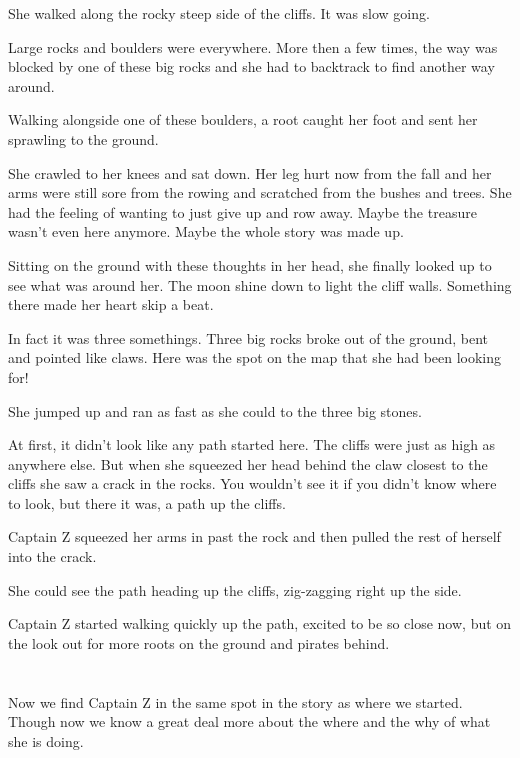 \documentclass[12pt]{extbook}
\begin{document}
  She walked along the rocky steep side of the cliffs. It was slow going.
  
  Large rocks and boulders were everywhere. More then a few times, the way
  was blocked by one of these big rocks and she had to backtrack to find
  another way around.
  
  Walking alongside one of these boulders, a root caught her foot and sent
  her sprawling to the ground.
  
  She crawled to her knees and sat down. Her leg hurt now from the fall
  and her arms were still sore from the rowing and scratched from the
  bushes and trees. She had the feeling of wanting to just give up and row
  away. Maybe the treasure wasn't even here anymore. Maybe the whole story
  was made up.
  
  Sitting on the ground with these thoughts in her head, she finally
  looked up to see what was around her. The moon shine down to light the
  cliff walls. Something there made her heart skip a beat.
  
  In fact it was three somethings. Three big rocks broke out of the
  ground, bent and pointed like claws. Here was the spot on the map that
  she had been looking for!
  
  She jumped up and ran as fast as she could to the three big stones.
  
  At first, it didn't look like any path started here. The cliffs were
  just as high as anywhere else. But when she squeezed her head behind the
  claw closest to the cliffs she saw a crack in the rocks. You wouldn't
  see it if you didn't know where to look, but there it was, a path up the
  cliffs.
  
  Captain Z squeezed her arms in past the rock and then pulled the rest of
  herself into the crack.
  
  She could see the path heading up the cliffs, zig-zagging right up the
  side.
  
  Captain Z started walking quickly up the path, excited to be so close
  now, but on the look out for more roots on the ground and pirates
  behind.
  
  \section{}\label{section-15}
  
  Now we find Captain Z in the same spot in the story as where we started.
  Though now we know a great deal more about the where and the why of what
  she is doing.
  
\end{document}

